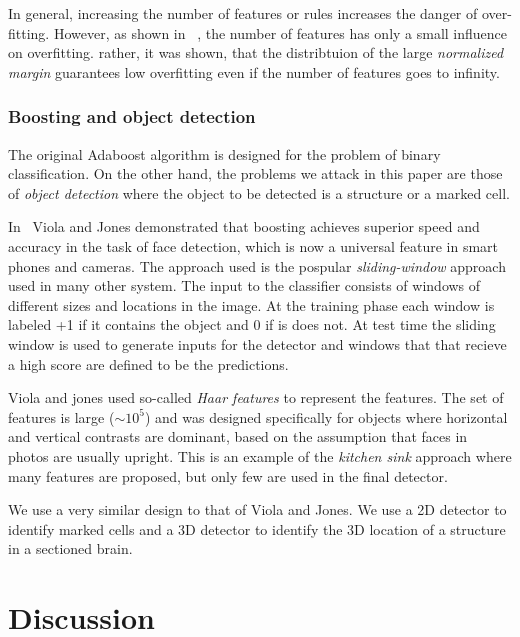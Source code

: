 \documentclass[11pt]{article}
\begin{document}
In general, increasing the number of features or rules increases the
danger of over-fitting. However, as shown in ~\cite{SchapireFrBaLe98}, the
number of features has only a small influence on overfitting. rather,
it was shown, that the distribtuion of the large {\em normalized
  margin} guarantees low overfitting even if the number of features
goes to infinity.


\subsubsection{Boosting and object detection}
The original Adaboost algorithm is designed for the problem of binary
classification. On the other hand, the problems we attack in this
paper are those of {\em object detection} where the object to be
detected is a structure or a marked cell.

In~\cite{violajones01} Viola and Jones demonstrated that boosting
achieves superior speed and accuracy in the task of face detection,
which is now a universal feature in smart phones and cameras.  The
approach used is the pospular {\em sliding-window} approach used in
many other system.  The input to the classifier consists of windows of
different sizes and locations in the image. At the training phase each
window is labeled +1 if it contains the object and 0 if is does
not. At test time the sliding window is used to generate inputs for
the detector and windows that that recieve a high score are defined to
be the predictions.

Viola and jones used so-called {\em Haar features} to represent the
features. The set of features is large ($\sim 10^5$) and was designed
specifically for objects where horizontal and vertical contrasts are
dominant, based on the assumption that faces in photos are usually
upright. This is an example of the {\em kitchen sink} approach where
many features are proposed, but only few are used in the final detector.

We use a very similar design to that of Viola and Jones. We use a 2D
detector to identify marked cells and a 3D detector to identify the 3D
location of a structure in a sectioned brain.


\section{Discussion}
\end{document}
